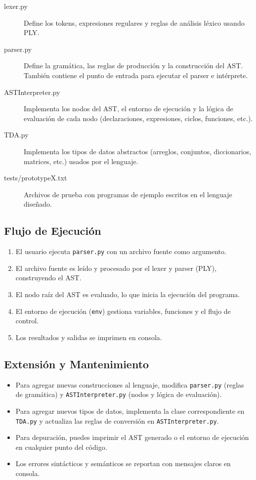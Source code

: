 \documentclass{article}
\begin{document}
\begin{description}
    \item[lexer.py] Define los tokens, expresiones regulares y reglas de análisis léxico usando PLY.
    \item[parser.py] Define la gramática, las reglas de producción y la construcción del AST. También contiene el punto de entrada para ejecutar el parser e intérprete.
    \item[ASTInterpreter.py] Implementa los nodos del AST, el entorno de ejecución y la lógica de evaluación de cada nodo (declaraciones, expresiones, ciclos, funciones, etc.).
    \item[TDA.py] Implementa los tipos de datos abstractos (arreglos, conjuntos, diccionarios, matrices, etc.) usados por el lenguaje.
    \item[tests/prototypeX.txt] Archivos de prueba con programas de ejemplo escritos en el lenguaje diseñado.
\end{description}

\subsection{Flujo de Ejecución}

\begin{enumerate}
    \item El usuario ejecuta \texttt{parser.py} con un archivo fuente como argumento.
    \item El archivo fuente es leído y procesado por el lexer y parser (PLY), construyendo el AST.
    \item El nodo raíz del AST es evaluado, lo que inicia la ejecución del programa.
    \item El entorno de ejecución (\texttt{env}) gestiona variables, funciones y el flujo de control.
    \item Los resultados y salidas se imprimen en consola.
\end{enumerate}

\subsection{Extensión y Mantenimiento}

\begin{itemize}
    \item Para agregar nuevas construcciones al lenguaje, modifica \texttt{parser.py} (reglas de gramática) y \texttt{ASTInterpreter.py} (nodos y lógica de evaluación).
    \item Para agregar nuevos tipos de datos, implementa la clase correspondiente en \texttt{TDA.py} y actualiza las reglas de conversión en \texttt{ASTInterpreter.py}.
    \item Para depuración, puedes imprimir el AST generado o el entorno de ejecución en cualquier punto del código.
    \item Los errores sintácticos y semánticos se reportan con mensajes claros en consola.
\end{itemize}
\end{document}
